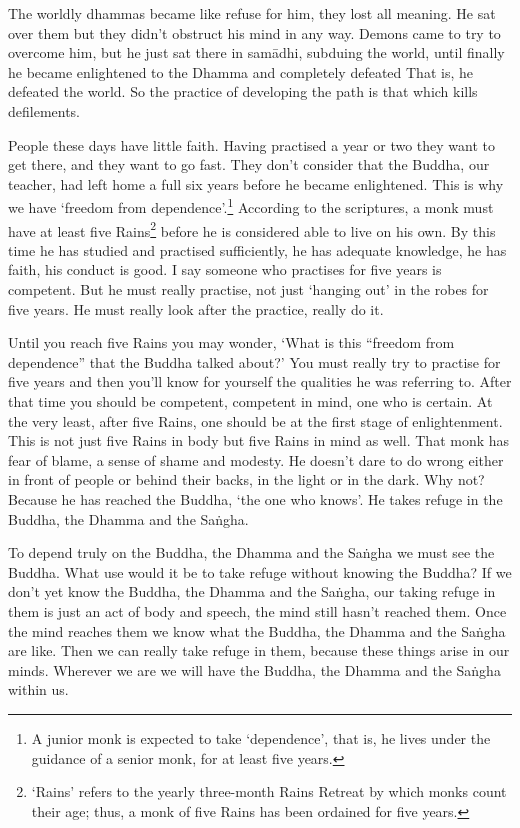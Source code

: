 The worldly dhammas became like refuse for him, they lost all meaning. He sat over them but they didn't obstruct his mind in any way. Demons came to try to overcome him, but he just sat there in sam\=adhi, subduing the world, until finally he became enlightened to the Dhamma and completely defeated  That is, he defeated the world. So the practice of developing the path is that which kills defilements.

People these days have little faith. Having practised a year or two they want to get there, and they want to go fast. They don't consider that the Buddha, our teacher, had left home a full six years before he became enlightened. This is why we have `freedom from dependence'.\footnote{A junior monk is expected to take `dependence', that is, he lives under the guidance of a senior monk, for at least five years.} According to the scriptures, a monk must have at least five Rains\footnote{`Rains' refers to the yearly three-month Rains Retreat by which monks count their age; thus, a monk of five Rains has been ordained for five years. } before he is considered able to live on his own. By this time he has studied and practised sufficiently, he has adequate knowledge, he has faith, his conduct is good. I say someone who practises for five years is competent. But he must really practise, not just `hanging out' in the robes for five years. He must really look after the practice, really do it.

Until you reach five Rains you may wonder, `What is this ``freedom from dependence'' that the Buddha talked about?' You must really try to practise for five years and then you'll know for yourself the qualities he was referring to. After that time you should be competent, competent in mind, one who is certain. At the very least, after five Rains, one should be at the first stage of enlightenment. This is not just five Rains in body but five Rains in mind as well. That monk has fear of blame, a sense of shame and modesty. He doesn't dare to do wrong either in front of people or behind their backs, in the light or in the dark. Why not? Because he has reached the Buddha, `the one who knows'. He takes refuge in the Buddha, the Dhamma and the Sa\.ngha.

To depend truly on the Buddha, the Dhamma and the Sa\.ngha we must see the Buddha. What use would it be to take refuge without knowing the Buddha? If we don't yet know the Buddha, the Dhamma and the Sa\.ngha, our taking refuge in them is just an act of body and speech, the mind still hasn't reached them. Once the mind reaches them we know what the Buddha, the Dhamma and the Sa\.ngha are like. Then we can really take refuge in them, because these things arise in our minds. Wherever we are we will have the Buddha, the Dhamma and the Sa\.ngha within us.

